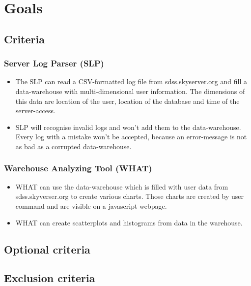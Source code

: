 \section{Goals}

\subsection{Criteria} %

\subsubsection{Server Log Parser (SLP)}
\begin{itemize}
\item The SLP can read a CSV-formatted log file from sdss.skyserver.org
 and fill a data-warehouse with multi-dimensional user information.
 The dimensions of this data are location of the user, location of the 
 database and time of the server-access. 
\item SLP will recognise invalid logs and won't add them to the data-warehouse.
 Every log with a mistake won't be accepted, because an error-message is not 
 as bad as a corrupted data-warehouse. 
\end{itemize}

\subsubsection{Warehouse Analyzing Tool (WHAT)}
\begin{itemize}
\item WHAT can use the data-warehouse which is filled with user data 
from sdss.skyverser.org to create various charts. 
Those charts are created by user command and are visible on a javascript-webpage.
\item WHAT can create scatterplots and histograms from data in the warehouse.
\end{itemize}

\subsection{Optional criteria}


\subsection{Exclusion criteria}
